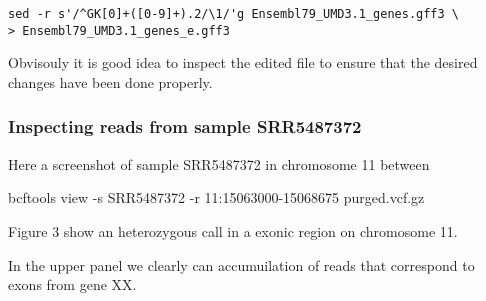 \begin{verbatim}
sed -r s'/^GK[0]+([0-9]+).2/\1/'g Ensembl79_UMD3.1_genes.gff3 \
> Ensembl79_UMD3.1_genes_e.gff3
\end{verbatim}

Obvisouly it is good idea to inspect the edited file to ensure that the desired changes have been done properly.



\subsubsection{Inspecting reads from sample SRR5487372}



Here a screenshot of sample SRR5487372 in chromosome 11 between 





bcftools view -s SRR5487372 -r 11:15063000-15068675  purged.vcf.gz

Figure 3 show an heterozygous call in a exonic region on chromosome 11.

In the upper panel we clearly can accumuilation of reads that correspond to exons from gene XX.







